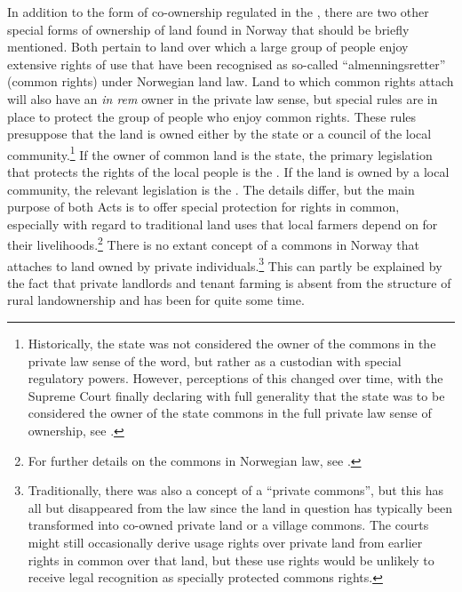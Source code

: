 In addition to the form of co-ownership regulated in the \cite{coa65}, there are two other special forms of ownership of land found in Norway that should be briefly mentioned. Both pertain to land over which a large group of people enjoy extensive rights of use that have been recognised as so-called ``almenningsretter'' (common rights) under Norwegian land law. Land to which common rights attach will also have an {\it in rem} owner in the private law sense, but special rules are in place to protect the group of people who enjoy common rights. These rules presuppose that the land is owned either by the state or a council of the local community.\footnote{Historically, the state was not considered the owner of the commons in the private law sense of the word, but rather as a custodian with special regulatory powers. However, perceptions of this changed over time, with the Supreme Court finally declaring with full generality that the state was to be considered the owner of the state commons in the full private law sense of ownership, see \cite{vinstra63}.} If the owner of common land is the state, the primary legislation that protects the rights of the local people is the \cite{ma75}. If the land is owned by a local community, the relevant legislation is the \cite{vca92}. The details differ, but the main purpose of both Acts is to offer special protection for rights in common, especially with regard to traditional land uses that local farmers depend on for their livelihoods.\footnote{For further details on the commons in Norwegian law, see \cite{stenseth05}.} There is no extant concept of a commons in Norway that attaches to land owned by private individuals.\footnote{Traditionally, there was also a concept of a ``private commons'', but this has all but disappeared from the law since the land in question has typically been transformed into co-owned private land or a village commons. The courts might still occasionally derive usage rights over private land from earlier rights in common over that land, but these use rights would be unlikely to receive legal recognition as specially protected commons rights.} This can partly be explained by the fact that private landlords and tenant farming is absent from the structure of rural landownership and has been for quite some time.


